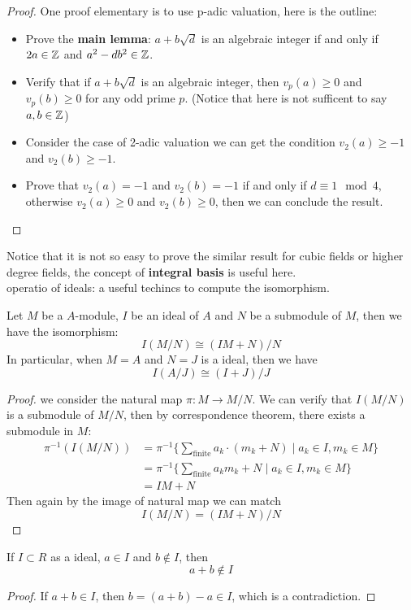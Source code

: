 \begin{proof}
    One proof elementary is to use p-adic valuation, here is the outline:
    \begin{itemize}
        \item Prove the \textbf{main lemma}: \(a+b\sqrt{d}\) is an algebraic integer if and only if \(2a \in \mathbb{Z}\) and \(a^2 - db^2 \in \mathbb{Z}\).
        \item Verify that if \(a+b\sqrt{d}\) is an algebraic integer, then \(v_p(a)\geq 0\) and \(v_p(b) \geq 0\) for any odd prime \(p\). (Notice that here is not sufficent to say \(a,b \in \mathbb{Z}\))
        \item Consider the case of 2-adic valuation we can get the condition \(v_2(a) \geq -1\) and \(v_2(b) \geq -1\).
        \item Prove that \(v_2(a) = -1 \) and \(v_2(b) = -1\) if and only if \(d \equiv 1 \mod 4\), otherwise \(v_2(a) \geq 0\) and \(v_2(b) \geq 0\), then we can conclude the result.
    \end{itemize}
\end{proof}
Notice that it is not so easy to prove the similar result for cubic fields or higher degree fields, the concept of \textbf{integral basis} is useful here.\\

operatio of ideals: a useful techincs to compute the isomorphism.
\begin{proposition}
    Let \(M\) be a \(A\)-module, \(I\) be an ideal of \(A\) and \(N\) be a submodule of \(M\), then we have the isomorphism:
    \[I(M/N) \cong (IM+N)/N\]
    In particular, when \(M=A\) and \(N = J\) is a ideal, then we have
    \[I(A/J) \cong (I+J)/J\]
\end{proposition}
\begin{proof}
    we consider the natural map \(\pi: M \to M/N\). We can verify that \(I(M/N)\) is a submodule of \(M/N\), then by correspondence theorem, there exists a submodule in \(M\):
    \begin{align*}
    \pi^{-1}(I(M/N)) &= \pi^{-1}\{\sum_{\text{finite}}a_k\cdot(m_k+N) \mid a_k \in I, m_k \in M \}\\
    &= \pi^{-1}\{\sum_{\text{finite}} a_k m_k + N \mid a_k \in I, m_k \in M\} \\
    &= IM + N
    \end{align*}
    Then again by the image of natural map we can match
    \[I(M/N) = (IM+N)/N\]
\end{proof}

\begin{proposition}
    If \(I \subset R\) as a ideal, \(a \in I\) and \(b \notin I\), then 
    \[a+b \notin I\]
\end{proposition}
\begin{proof}
    If \(a+b \in I\), then \(b = (a+b) - a \in I\), which is a contradiction.
\end{proof}\




